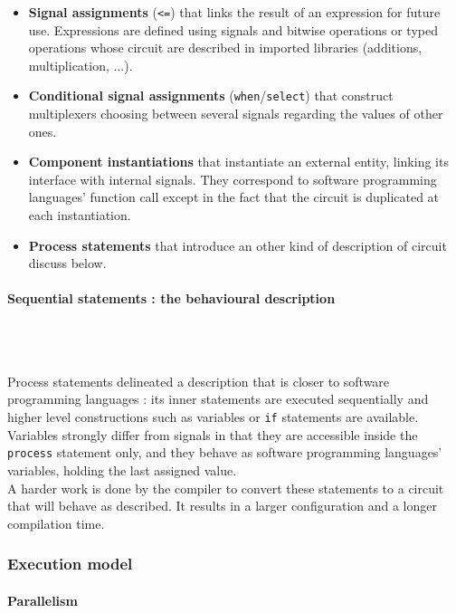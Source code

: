 \documentclass[10pt,a4paper]{article}
\newcommand{\code}{\texttt}
\renewcommand{\indent}{~\\\vspace{-.8cm}}
\newcommand{\pindent}{~\\\indent}
\begin{document}
\begin{itemize}
	\item \textbf{Signal assignments} (\code{<=}) that links the result of an expression for future use. Expressions are defined using signals and bitwise operations or typed operations whose circuit are described in imported libraries (additions, multiplication, ...).
	\item \textbf{Conditional signal assignments} (\code{when}/\code{select}) that construct multiplexers choosing between several signals regarding the values of other ones.
	\item \textbf{Component instantiations} that instantiate an external entity, linking its interface with internal signals. They correspond to software programming languages' function call except in the fact that the circuit is duplicated at each instantiation.
	\item \textbf{Process statements} that introduce an other kind of description of circuit discuss below.
\end{itemize}


\paragraph{Sequential statements : the behavioural description}\pindent

Process statements delineated a description that is closer to software programming languages : its inner statements are executed sequentially and higher level constructions such as variables or \code{if} statements are available.\\

Variables strongly differ from signals in that they are accessible inside the \code{process} statement only, and they behave as software programming languages' variables, holding the last assigned value.\\

A harder work is done by the compiler to convert these statements to a circuit that will behave as described. It results in a larger configuration and a longer compilation time.

\subsubsection{Execution model}

\paragraph{Parallelism}\pindent
\end{document}
